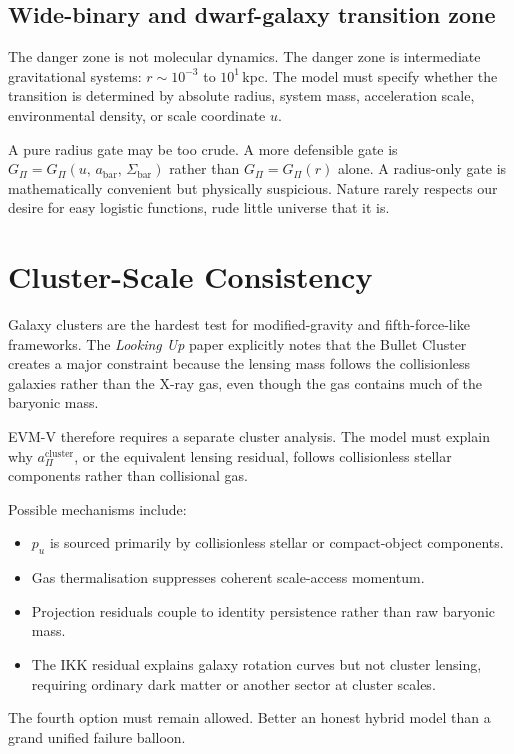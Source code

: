\documentclass[11pt,a4paper,oneside]{article}
\newcommand{\abar}{a_{\mathrm{bar}}}
\newcommand{\aPi}{a_{\Pi}}
\newcommand{\pu}{p_u}
\newcommand{\usc}{u}                    %
\newcommand{\GPi}{G_{\Pi}}
\newcommand{\Sbar}{\Sigma_{\mathrm{bar}}}
\begin{document}
\subsection{Wide-binary and dwarf-galaxy transition zone}

The danger zone is not molecular dynamics. The danger zone is intermediate gravitational
systems: $r \sim 10^{-3}$ to $10^1$\,kpc. The model must specify whether the
transition is determined by absolute radius, system mass, acceleration scale,
environmental density, or scale coordinate $\usc$.

A pure radius gate may be too crude. A more defensible gate is
$\GPi = \GPi(\usc,\,\abar,\,\Sbar)$ rather than $\GPi = \GPi(r)$ alone. A
radius-only gate is mathematically convenient but physically suspicious. Nature rarely
respects our desire for easy logistic functions, rude little universe that it is.

\section{Cluster-Scale Consistency}

Galaxy clusters are the hardest test for modified-gravity and fifth-force-like
frameworks. The \emph{Looking Up} paper explicitly notes that the Bullet Cluster creates
a major constraint because the lensing mass follows the collisionless galaxies rather
than the X-ray gas, even though the gas contains much of the baryonic mass.

EVM-V therefore requires a separate cluster analysis. The model must explain why
$\aPi^{\mathrm{cluster}}$, or the equivalent lensing residual, follows collisionless
stellar components rather than collisional gas.

Possible mechanisms include:
\begin{itemize}
  \item $\pu$ is sourced primarily by collisionless stellar or compact-object components.
  \item Gas thermalisation suppresses coherent scale-access momentum.
  \item Projection residuals couple to identity persistence rather than raw baryonic mass.
  \item The IKK residual explains galaxy rotation curves but not cluster lensing,
        requiring ordinary dark matter or another sector at cluster scales.
\end{itemize}
The fourth option must remain allowed. Better an honest hybrid model than a grand
unified failure balloon.
\end{document}
